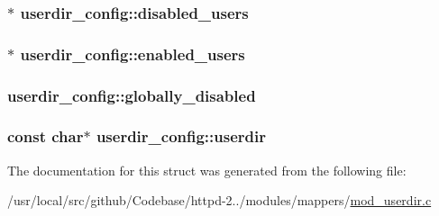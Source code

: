 \subsubsection[{\texorpdfstring{disabled\+\_\+users}{disabled_users}}]{$\ast$ userdir\+\_\+config\+::disabled\+\_\+users}\hypertarget{structuserdir__config_a0cc37ae8df7448251b6ef49d9a07fa97}{}\label{structuserdir__config_a0cc37ae8df7448251b6ef49d9a07fa97}
\subsubsection[{\texorpdfstring{enabled\+\_\+users}{enabled_users}}]{$\ast$ userdir\+\_\+config\+::enabled\+\_\+users}\hypertarget{structuserdir__config_a0a18b2733800809a369f04370ee926fd}{}\label{structuserdir__config_a0a18b2733800809a369f04370ee926fd}
\subsubsection[{\texorpdfstring{globally\+\_\+disabled}{globally_disabled}}]{ userdir\+\_\+config\+::globally\+\_\+disabled}\hypertarget{structuserdir__config_afdc5e764caf281faf28125f0148739f7}{}\label{structuserdir__config_afdc5e764caf281faf28125f0148739f7}
\subsubsection[{\texorpdfstring{userdir}{userdir}}]{\setlength{\rightskip}{0pt plus 5cm}const char$\ast$ userdir\+\_\+config\+::userdir}\hypertarget{structuserdir__config_a6e9209489d54f27d6f914fbd0a5f5d49}{}\label{structuserdir__config_a6e9209489d54f27d6f914fbd0a5f5d49}


The documentation for this struct was generated from the following file\+:\begin{DoxyCompactItemize}
\item 
/usr/local/src/github/\+Codebase/httpd-\/2../modules/mappers/\hyperlink{mod__userdir_8c}{mod\+\_\+userdir.\+c}\end{DoxyCompactItemize}

